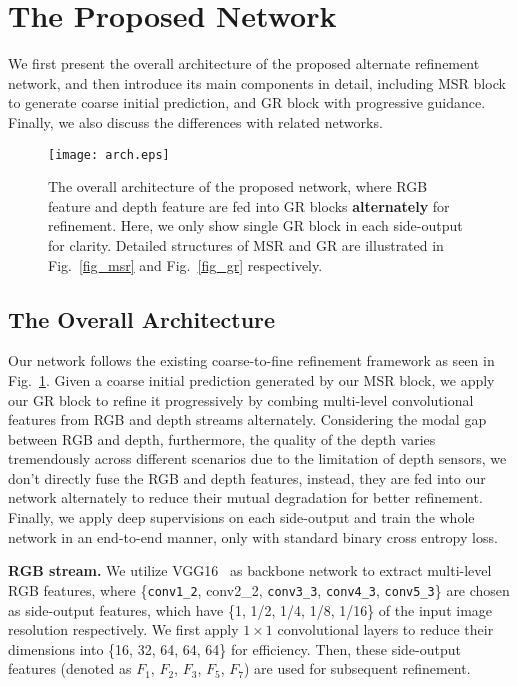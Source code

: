\documentclass[runningheads]{llncs}
\begin{document}
\section{The Proposed Network}
We first present the overall architecture of the proposed alternate refinement network, and then introduce its main components in detail, including MSR block to generate coarse initial prediction, and GR block with progressive guidance. Finally, we also discuss the differences with related networks.

\begin{figure*}  
  \centering  
  \texttt{[image: arch.eps]}
  \caption{The overall architecture of the proposed network, where RGB feature and depth feature are fed into GR blocks \textbf{alternately} for refinement. Here, we only show single GR block in each side-output for clarity. Detailed structures of MSR and GR are illustrated in Fig.~\ref{fig_msr} and Fig.~\ref{fig_gr} respectively.}  
  \label{fig_architecture}  
\end{figure*}

\subsection{The Overall Architecture}
Our network follows the existing coarse-to-fine refinement framework as seen in Fig.~\ref{fig_architecture}. Given a coarse initial prediction generated by our MSR block, we apply our GR block to refine it progressively by combing multi-level convolutional features from RGB and depth streams alternately. Considering the modal gap between RGB and depth, furthermore, the quality of the depth varies tremendously across different scenarios due to the limitation of depth sensors, we don't directly fuse the RGB and depth features, instead, they are fed into our network alternately to reduce their mutual degradation for better refinement. Finally, we apply deep supervisions on each side-output and train the whole network in an end-to-end manner, only with standard binary cross entropy loss.

\textbf{RGB stream.} We utilize VGG16~\cite{simonyan2015very} as backbone network to extract multi-level RGB features, where \{{\texttt{conv1\_2}}, {conv2\_2}, {\texttt{conv3\_3}}, {\texttt{conv4\_3}}, {\texttt{conv5\_3}}\} are chosen as side-output features, which have \{1, 1/2, 1/4, 1/8, 1/16\} of the input image resolution respectively. We first apply $1\times1$ convolutional layers to reduce their dimensions into \{16, 32, 64, 64, 64\} for efficiency. Then, these side-output features (denoted as $F_{1}$, $F_{2}$, $F_{3}$, $F_{5}$, $F_{7}$) are used for subsequent refinement.
\end{document}
